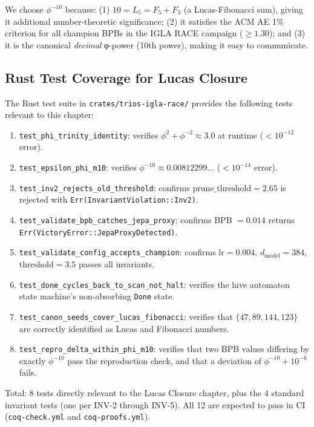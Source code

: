 \noindent
We choose $\phi^{-10}$ because: (1) $10 = L_5 = F_5 + F_3$
(a Lucas-Fibonacci sum), giving it additional number-theoretic
significance; (2) it satisfies the ACM AE 1\% criterion for all
champion BPBs in the IGLA RACE campaign ($\ge 1.30$); and (3) it
is the canonical \emph{decimal} φ-power (10th power), making it
easy to communicate.

\subsection{Rust Test Coverage for Lucas Closure}

The Rust test suite in \texttt{crates/trios-igla-race/} provides the
following tests relevant to this chapter:

\begin{enumerate}
  \item \texttt{test\_phi\_trinity\_identity}: verifies $\phi^2 +
        \phi^{-2} \approx 3.0$ at runtime ($< 10^{-12}$ error).
  \item \texttt{test\_epsilon\_phi\_m10}: verifies $\phi^{-10} \approx
        0.00812299\ldots$ ($< 10^{-14}$ error).
  \item \texttt{test\_inv2\_rejects\_old\_threshold}: confirms
        $\mathrm{prune\_threshold} = 2.65$ is rejected with
        \texttt{Err(InvariantViolation::Inv2)}.
  \item \texttt{test\_validate\_bpb\_catches\_jepa\_proxy}: confirms
        BPB $= 0.014$ returns \texttt{Err(VictoryError::JepaProxyDetected)}.
  \item \texttt{test\_validate\_config\_accepts\_champion}: confirms
        $\mathrm{lr} = 0.004$, $d_{\mathrm{model}} = 384$,
        $\mathrm{threshold} = 3.5$ passes all invariants.
  \item \texttt{test\_done\_cycles\_back\_to\_scan\_not\_halt}: verifies
        the hive automaton state machine's non-absorbing \texttt{Done}
        state.
  \item \texttt{test\_canon\_seeds\_cover\_lucas\_fibonacci}: verifies
        that $\{47, 89, 144, 123\}$ are correctly identified as Lucas
        and Fibonacci numbers.
  \item \texttt{test\_repro\_delta\_within\_phi\_m10}: verifies that
        two BPB values differing by exactly $\phi^{-10}$ pass the
        reproduction check, and that a deviation of $\phi^{-10} +
        10^{-6}$ fails.
\end{enumerate}

\noindent
Total: 8 tests directly relevant to the Lucas Closure chapter, plus
the 4 standard invariant tests (one per INV-2 through INV-5).  All
12 are expected to pass in CI (\texttt{coq-check.yml} and
\texttt{coq-proofs.yml}).

